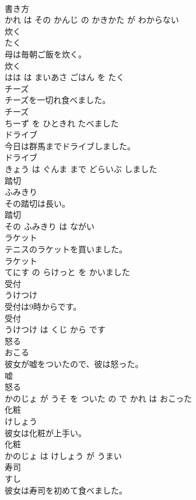 \documentclass[8pt]{extreport}
\begin{document}
\begin{CJK}{UTF8}{min}
\\	書き方 
\\	かれ は その かんじ の かきかた が わからない			
\\	炊く	
\\	たく			
\\	母は毎朝ご飯を炊く。	
\\	炊く 
\\	はは は まいあさ ごはん を たく			
\\	チーズ	
\\	チーズを一切れ食べました。	
\\	チーズ 
\\	ちーず を ひときれ たべました			
\\	ドライブ	
\\	今日は群馬までドライブしました。	
\\	ドライブ 
\\	きょう は ぐんま まで どらいぶ しました			
\\	踏切	
\\	ふみきり			
\\	その踏切は長い。	
\\	踏切 
\\	その ふみきり は ながい			
\\	ラケット	
\\	テニスのラケットを買いました。	
\\	ラケット 
\\	てにす の らけっと を かいました			
\\	受付	
\\	うけつけ			
\\	受付は9時からです。	
\\	受付 
\\	うけつけ は くじ から です			
\\	怒る	
\\	おこる			
\\	彼女が嘘をついたので、彼は怒った。	
\\	嘘 
\\	怒る 
\\	かのじょ が うそ を ついた の で かれ は おこった			
\\	化粧	
\\	けしょう			
\\	彼女は化粧が上手い。	
\\	化粧 
\\	かのじょ は けしょう が うまい			
\\	寿司	
\\	すし			
\\	彼女は寿司を初めて食べました。	

\end{CJK}
\end{document}
